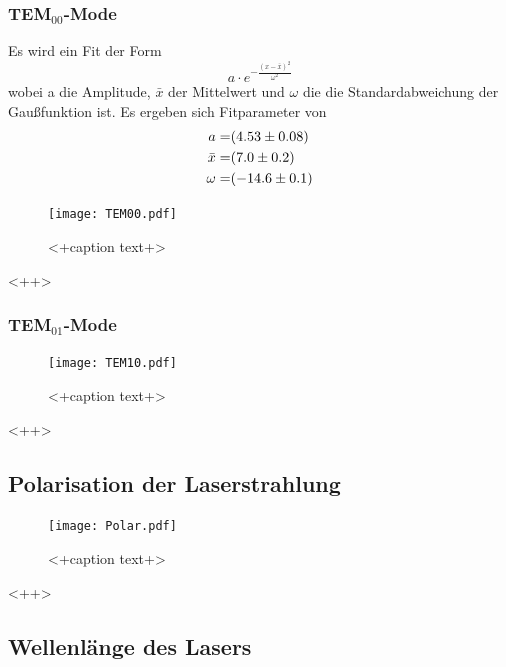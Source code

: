 \subsubsection{TEM$_\text{00}$-Mode}

Es wird ein Fit der Form 
\begin{equation}
  a \cdot e^{- \frac{(x-\bar{x})^2}{\omega^2} }
  \label{eqn:gausian}
\end{equation}
wobei a die Amplitude, $\bar{x}$ der Mittelwert und $\omega$ die die Standardabweichung der Gaußfunktion ist. Es ergeben sich Fitparameter von 
\begin{eqnarray}
  a =& (\num{4.53 +- 0.08})	\\
  \bar{x} =& (\num{7.0 +- 0.2})	\\
  \omega =& (\num{-14.6 +-0.1})	
  \label{eqn:coef}
\end{eqnarray}
\begin{figure}
  \centering
  \texttt{[image: TEM00.pdf]}
  \caption{<+caption text+>}
  \label{fig:<+label+>}
\end{figure}<++>
\subsubsection{TEM$_\text{01}$-Mode}
\begin{figure}
  \centering
  \texttt{[image: TEM10.pdf]}
  \caption{<+caption text+>}
  \label{fig:<+label+>}
\end{figure}<++>

\subsection{Polarisation der Laserstrahlung}

\begin{figure}
  \centering
  \texttt{[image: Polar.pdf]}
  \caption{<+caption text+>}
  \label{fig:<+label+>}
\end{figure}<++>
\subsection{Wellenlänge des Lasers}

